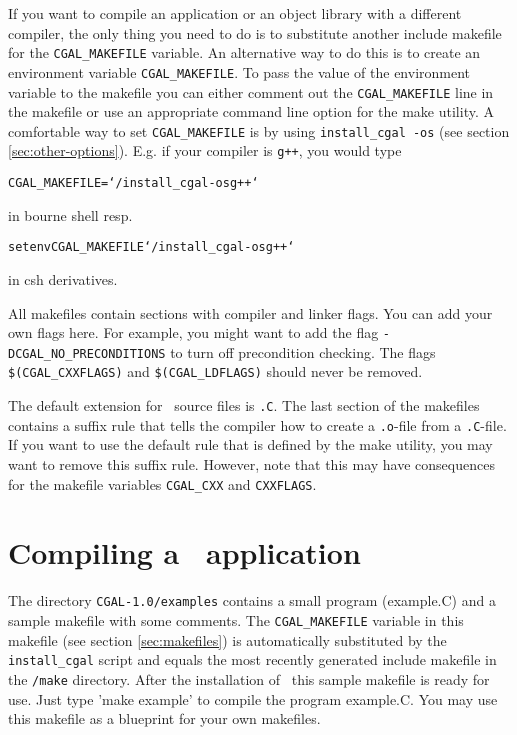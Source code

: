 If you want to compile an application or an object library with a
different compiler, the only thing you need to do is to substitute
another include makefile for the \texttt{CGAL\_MAKEFILE} variable. An
alternative way to do this is to create an environment variable
\texttt{CGAL\_MAKEFILE}. To pass the value of the environment variable
to the makefile you can either comment out the \texttt{CGAL\_MAKEFILE}
line in the makefile or use an appropriate command line option for
the make utility.
A comfortable way to set \texttt{CGAL\_MAKEFILE} is by using
\texttt{install\_cgal~-os} (see section \ref{sec:other-options}).
E.g. if your compiler is \texttt{g++}, you would type
\begin{alltt}
CGAL_MAKEFILE=`\yourcgaldir/install_cgal -os g++`
\end{alltt}
in bourne shell resp.
\begin{alltt}
setenv CGAL_MAKEFILE `\yourcgaldir/install_cgal -os g++`
\end{alltt}
in csh derivatives.

All makefiles contain sections with compiler and linker
flags.  You can add your own flags here. For example, you might want
to add the flag \texttt{-DCGAL\_NO\_PRECONDITIONS} to turn off
precondition checking. The flags \texttt{\$(CGAL\_CXXFLAGS)} and
\texttt{\$(CGAL\_LDFLAGS)} should never be removed.

The default extension for \cgal\ source files is \texttt{.C}.  The
last section of the makefiles contains a suffix rule that tells the
compiler how to create a \texttt{.o}-file from a \texttt{.C}-file.  If
you want to use the default rule that is defined by the make utility,
you may want to remove this suffix rule.  However, note that this may
have consequences for the makefile variables
\texttt{CGAL\_CXX} and \texttt{CXXFLAGS}.

\section{Compiling a \cgal\ application}
The directory \texttt{CGAL-1.0/examples} contains a small program (example.C)
and a sample makefile with some comments. The \texttt{CGAL\_MAKEFILE}
variable in this makefile (see section \ref{sec:makefiles}) is automatically substituted
by the \texttt{install\_cgal} script and equals the most recently generated include
makefile in the \texttt{\cgaldir/make} directory. After the installation of \cgal\ this
sample makefile is ready for use. Just type 'make example' to compile the program example.C.
You may use this makefile as a blueprint for your own makefiles.

